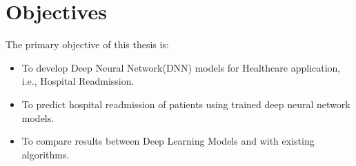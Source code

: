 \documentclass[12pt,a4paper]{article}
\begin{document}
\section{Objectives}
The primary objective of this thesis is:
\begin{itemize}
    \item To develop Deep Neural Network(DNN) models for Healthcare application, i.e., Hospital Readmission.
    \item To predict hospital readmission of patients using trained deep neural network models.
    \item To compare results between Deep Learning Models and with existing algorithms.
\end{itemize}



\end{document}
